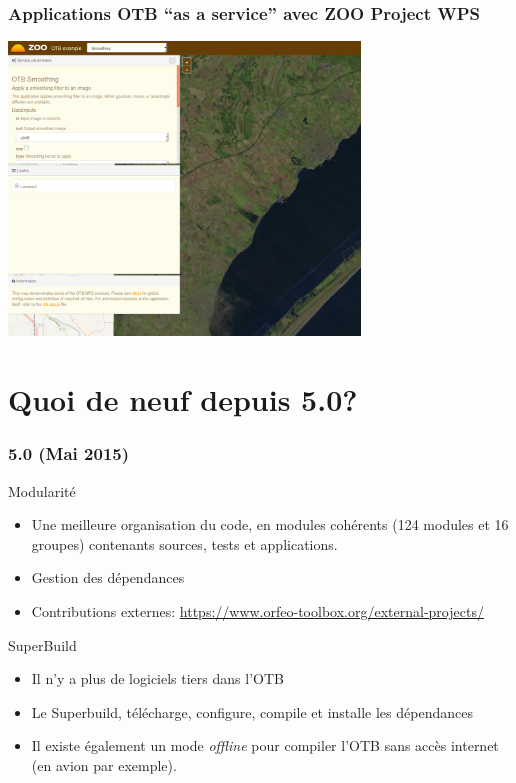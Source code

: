 \documentclass[8pt]{beamer}
\begin{document}
\begin{frame}
  \frametitle{Applications OTB ``as a service'' avec ZOO Project WPS}
\begin{minipage}[t][6cm][t]{\textwidth}
\begin{center}
\includegraphics[width=0.7\textwidth]{images/otb_in_zoo.png}
\end{center}
\end{minipage}
\end{frame}

\section{Quoi de neuf depuis 5.0?}

\begin{frame}
\frametitle{5.0 (Mai 2015)}
\begin{block}{Modularité}
\begin{itemize}
\item Une meilleure organisation du code, en modules cohérents (124 modules et
    16 groupes) contenants sources, tests et applications.
\item Gestion des dépendances
\item Contributions externes: \url{https://www.orfeo-toolbox.org/external-projects/}
\end{itemize}
\end{block}

\begin{block}{SuperBuild}
\begin{itemize}
\item Il n'y a plus de logiciels tiers dans l'OTB
\item Le Superbuild, télécharge, configure, compile et installe les dépendances
\item Il existe également un mode \textit{offline} pour compiler l'OTB sans
  accès internet (en avion par exemple).
\end{itemize}
\end{block}
\end{frame}
\end{document}
